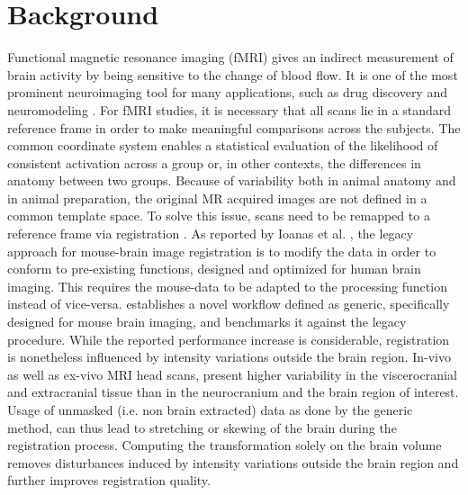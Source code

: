 \section{Background}
Functional magnetic resonance imaging (fMRI) gives an indirect measurement of brain activity by being sensitive to the change of blood flow. It is one of the most prominent neuroimaging tool for many applications, such as drug discovery
\cite{borsook_role_2006}
and neuromodeling
\cite{friston_dynamic_2003}.
For fMRI studies, it is necessary that all scans lie in a standard reference frame in order to make meaningful comparisons across the subjects.
The common coordinate system enables a statistical evaluation of the likelihood of consistent activation across a group or, in other contexts, the differences in anatomy between two groups.
Because of variability both in animal anatomy and in animal preparation, the original MR acquired images are not defined in a common template space.
To solve this issue, scans need to be remapped to a reference frame via registration \cite{maintz_overview_nodate, sotiras_deformable_2013}.
As reported by Ioanas et al. \cite{ioanas_optimized_2019}, the legacy approach for mouse-brain image registration is to modify the data in order to conform to pre-existing functions, designed and optimized for human brain imaging.
This requires the mouse-data to be adapted to the processing function instead of vice-versa.
\cite{ioanas_optimized_2019} establishes a novel workflow defined as generic, specifically designed for mouse brain imaging, and benchmarks it against the legacy procedure.
While the reported performance increase is considerable, registration is nonetheless influenced by intensity variations outside the brain region.
In-vivo as well as ex-vivo MRI head scans, present higher variability in the viscerocranial and extracranial tissue than in the neurocranium and the brain region of interest.
Usage of unmasked (i.e. non brain extracted) data as done by the generic method, can thus lead to stretching or skewing of the brain during the registration process.
Computing the transformation solely on the brain volume removes disturbances induced by intensity variations outside the brain region and further improves registration quality.

